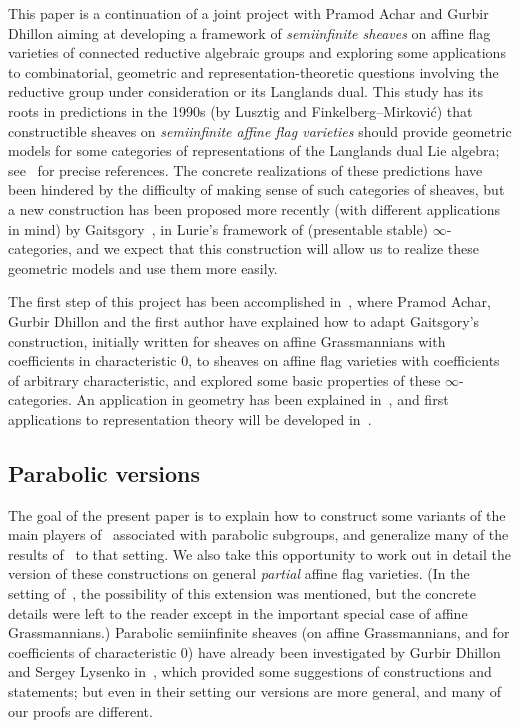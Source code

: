 \documentclass[11pt]{amsart}
\numberwithin{equation}{section}
\theoremstyle{plain}
\theoremstyle{definition}
\begin{document}
This paper is a continuation of a joint project with Pramod Achar and Gurbir Dhillon aiming at developing a framework of \emph{semiinfinite sheaves} on affine flag varieties of connected reductive algebraic groups and exploring some applications to combinatorial, geometric and representation-theoretic questions involving the reductive group under consideration or its Langlands dual.
This study has its roots in predictions in the 1990s (by Lusztig and Finkelberg--Mirkovi{\'c}) that constructible sheaves on \emph{semiinfinite affine flag varieties} should provide geome\-tric models for some categories of representations of the Langlands dual Lie algebra; see~\cite[\S 1.1]{adr} for precise references. 
The concrete realizations of these predictions have been hindered by the difficulty of making sense of such categories of sheaves, but a new construction has been proposed more recently (with different applications in mind) by Gaitsgory~\cite{Gaits18}, in Lurie's framework of (presentable stable) $\infty$-categories, and we expect that this construction will allow us to realize these geometric models and use them more easily.

The first step of this project has been accomplished in~\cite{adr}, where Pramod Achar, Gurbir Dhillon and the first author have explained how to adapt Gaitsgory's construction, initially written for sheaves on affine Grassmannians with coefficients in characteristic $0$, to sheaves on affine flag varieties with coefficients of arbitrary characteristic, and explored some basic properties of these $\infty$-categories. An application in geometry has been explained in~\cite{adr-Drinfeld}, and first applications to representation theory will be developed in~\cite{adr-Gr,adrs}.

\subsection{Parabolic versions}

The goal of the present paper is to explain how to construct some variants of the main players of~\cite{adr} associated with parabolic subgroups, and generalize many of the results of~\cite{adr} to that setting.
We also take this opportunity to work out in detail the version of these constructions on general \emph{partial} affine flag varieties. (In the setting of~\cite{adr}, the possibility of this extension was mentioned, but the concrete details were left to the reader except in the important special case of affine Grassmannians.) Parabolic semiinfinite sheaves (on affine Grassmannians, and for coefficients of characteristic $0$) have already been investigated by Gurbir Dhillon and Sergey Lysenko in~\cite{DL23}, which provided some suggestions of constructions and statements; but even in their setting our versions are more general, and many of our proofs are different.
\end{document}
